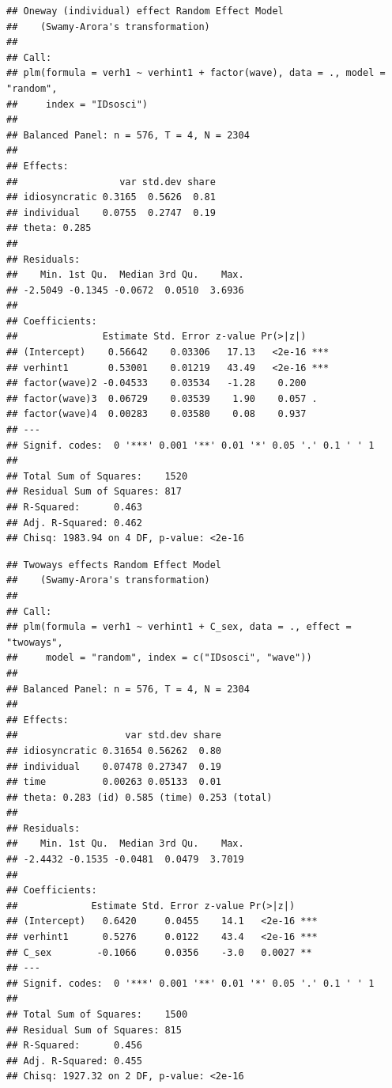 \documentclass[
]{book}
\newenvironment{Shaded}{\begin{snugshade}}{\end{snugshade}}
\newcommand{\CommentTok}[1]{\textcolor[rgb]{0.56,0.35,0.01}{\textit{#1}}}
\newcommand{\DataTypeTok}[1]{\textcolor[rgb]{0.13,0.29,0.53}{#1}}
\newcommand{\KeywordTok}[1]{\textcolor[rgb]{0.13,0.29,0.53}{\textbf{#1}}}
\newcommand{\NormalTok}[1]{#1}
\newcommand{\OperatorTok}[1]{\textcolor[rgb]{0.81,0.36,0.00}{\textbf{#1}}}
\newcommand{\StringTok}[1]{\textcolor[rgb]{0.31,0.60,0.02}{#1}}
\begin{document}
\begin{verbatim}
## Oneway (individual) effect Random Effect Model 
##    (Swamy-Arora's transformation)
## 
## Call:
## plm(formula = verh1 ~ verhint1 + factor(wave), data = ., model = "random", 
##     index = "IDsosci")
## 
## Balanced Panel: n = 576, T = 4, N = 2304
## 
## Effects:
##                  var std.dev share
## idiosyncratic 0.3165  0.5626  0.81
## individual    0.0755  0.2747  0.19
## theta: 0.285
## 
## Residuals:
##    Min. 1st Qu.  Median 3rd Qu.    Max. 
## -2.5049 -0.1345 -0.0672  0.0510  3.6936 
## 
## Coefficients:
##               Estimate Std. Error z-value Pr(>|z|)    
## (Intercept)    0.56642    0.03306   17.13   <2e-16 ***
## verhint1       0.53001    0.01219   43.49   <2e-16 ***
## factor(wave)2 -0.04533    0.03534   -1.28    0.200    
## factor(wave)3  0.06729    0.03539    1.90    0.057 .  
## factor(wave)4  0.00283    0.03580    0.08    0.937    
## ---
## Signif. codes:  0 '***' 0.001 '**' 0.01 '*' 0.05 '.' 0.1 ' ' 1
## 
## Total Sum of Squares:    1520
## Residual Sum of Squares: 817
## R-Squared:      0.463
## Adj. R-Squared: 0.462
## Chisq: 1983.94 on 4 DF, p-value: <2e-16
\end{verbatim}

\begin{Shaded}
\end{Shaded}

\begin{verbatim}
## Twoways effects Random Effect Model 
##    (Swamy-Arora's transformation)
## 
## Call:
## plm(formula = verh1 ~ verhint1 + C_sex, data = ., effect = "twoways", 
##     model = "random", index = c("IDsosci", "wave"))
## 
## Balanced Panel: n = 576, T = 4, N = 2304
## 
## Effects:
##                   var std.dev share
## idiosyncratic 0.31654 0.56262  0.80
## individual    0.07478 0.27347  0.19
## time          0.00263 0.05133  0.01
## theta: 0.283 (id) 0.585 (time) 0.253 (total)
## 
## Residuals:
##    Min. 1st Qu.  Median 3rd Qu.    Max. 
## -2.4432 -0.1535 -0.0481  0.0479  3.7019 
## 
## Coefficients:
##             Estimate Std. Error z-value Pr(>|z|)    
## (Intercept)   0.6420     0.0455    14.1   <2e-16 ***
## verhint1      0.5276     0.0122    43.4   <2e-16 ***
## C_sex        -0.1066     0.0356    -3.0   0.0027 ** 
## ---
## Signif. codes:  0 '***' 0.001 '**' 0.01 '*' 0.05 '.' 0.1 ' ' 1
## 
## Total Sum of Squares:    1500
## Residual Sum of Squares: 815
## R-Squared:      0.456
## Adj. R-Squared: 0.455
## Chisq: 1927.32 on 2 DF, p-value: <2e-16
\end{verbatim}
\end{document}
